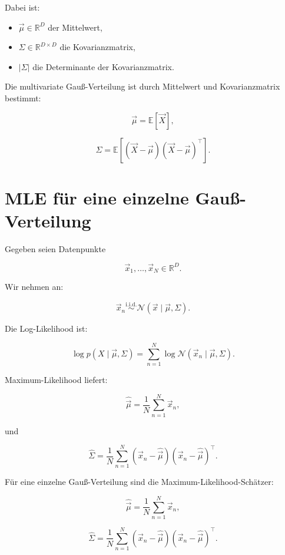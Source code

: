 Dabei ist:

\begin{itemize}
    \item \(\vec{\mu}\in\mathbb{R}^D\) der Mittelwert,
    \item \(\Sigma\in\mathbb{R}^{D\times D}\) die Kovarianzmatrix,
    \item \(|\Sigma|\) die Determinante der Kovarianzmatrix.
\end{itemize}

\begin{definitionbox}
Die multivariate Gauß-Verteilung ist durch Mittelwert und Kovarianzmatrix bestimmt:

\[
    \vec{\mu}
    =
    \mathbb{E}[\vec{X}],
\]

\[
    \Sigma
    =
    \mathbb{E}
    \left[
        (\vec{X}-\vec{\mu})(\vec{X}-\vec{\mu})^{\top}
    \right].
\]
\end{definitionbox}

\section{MLE für eine einzelne Gauß-Verteilung}

Gegeben seien Datenpunkte

\[
    \vec{x}_1,\dots,\vec{x}_N
    \in
    \mathbb{R}^D.
\]

Wir nehmen an:

\[
    \vec{x}_n
    \overset{\mathrm{i.i.d.}}{\sim}
    \mathcal{N}(\vec{x}\mid\vec{\mu},\Sigma).
\]

Die Log-Likelihood ist:

\[
    \log p(X\mid\vec{\mu},\Sigma)
    =
    \sum_{n=1}^{N}
    \log
    \mathcal{N}(\vec{x}_n\mid\vec{\mu},\Sigma).
\]

Maximum-Likelihood liefert:

\[
    \hat{\vec{\mu}}
    =
    \frac{1}{N}
    \sum_{n=1}^{N}
    \vec{x}_n,
\]

und

\[
    \hat{\Sigma}
    =
    \frac{1}{N}
    \sum_{n=1}^{N}
    (\vec{x}_n-\hat{\vec{\mu}})
    (\vec{x}_n-\hat{\vec{\mu}})^{\top}.
\]

\begin{definitionbox}
Für eine einzelne Gauß-Verteilung sind die Maximum-Likelihood-Schätzer:

\[
    \hat{\vec{\mu}}
    =
    \frac{1}{N}
    \sum_{n=1}^{N}
    \vec{x}_n,
\]

\[
    \hat{\Sigma}
    =
    \frac{1}{N}
    \sum_{n=1}^{N}
    (\vec{x}_n-\hat{\vec{\mu}})
    (\vec{x}_n-\hat{\vec{\mu}})^{\top}.
\]
\end{definitionbox}

